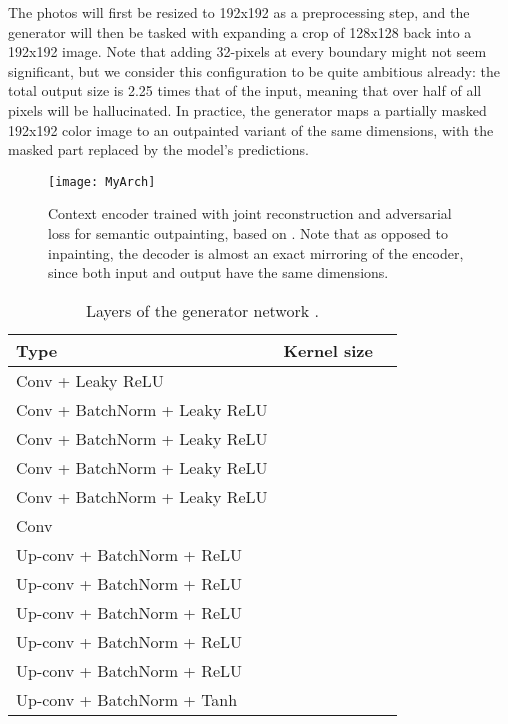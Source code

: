 \documentclass[twocolumn,showpacs,nofootinbib,aps,superscriptaddress,eqsecnum,prd,notitlepage,showkeys,10pt]{revtex4-1}
\begin{document}
The photos will first be resized to 192x192 as a preprocessing step, and the generator will then be tasked with expanding a crop of 128x128 back into a 192x192 image. Note that adding 32-pixels at every boundary might not seem significant, but we consider this configuration to be quite ambitious already: the total output size is 2.25 times that of the input, meaning that over half of all pixels will be hallucinated. In practice, the generator  maps a partially masked 192x192 color image to an outpainted variant of the same dimensions, with the masked part replaced by the model's predictions.

\begin{figure*}[tp]
  \centering
  \begin{adjustbox}{center}
  \texttt{[image: MyArch]}
  \end{adjustbox}
  \caption{Context encoder trained with joint reconstruction and adversarial loss for semantic outpainting, based on \cite{Pathak2016}. Note that as opposed to inpainting, the decoder is almost an exact mirroring of the encoder, since both input and output have the same dimensions.}
  \label{fig:MyArch}
\end{figure*}

\begin{table}[tp]
\centering
\footnotesize
\begin{tabular}{l c c}
  \hline
  Type & Kernel size &  \\ \hline\hline
  Conv + Leaky ReLU &  &  \\
  Conv + BatchNorm + Leaky ReLU &  &  \\
  Conv + BatchNorm + Leaky ReLU &  &  \\
  Conv + BatchNorm + Leaky ReLU &  &  \\
  Conv + BatchNorm + Leaky ReLU &  &  \\
  Conv &  &  \\
  Up-conv + BatchNorm + ReLU &  &  \\
  Up-conv + BatchNorm + ReLU &  &  \\
  Up-conv + BatchNorm + ReLU &  &  \\
  Up-conv + BatchNorm + ReLU &  &  \\
  Up-conv + BatchNorm + ReLU &  &  \\
  Up-conv + BatchNorm + Tanh &  &  \\ \hline
\end{tabular}
\caption{Layers of the generator network .}
\label{tab:layers_G}
\end{table}
\end{document}
